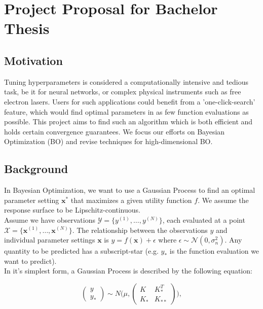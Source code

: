 \section{Project Proposal for Bachelor Thesis}
\subsection{Motivation}

Tuning hyperparameters is considered a computationally intensive and tedious task, be it for neural networks, or complex physical instruments such as free electron lasers.
Users for such applications could benefit from a 'one-click-search' feature, which would find optimal parameters in as few function evaluations as possible.
This project aims to find such an algorithm which is both efficient and holds certain convergence guarantees.
We focus our efforts on Bayesian Optimization (BO) and revise techniques for high-dimensional BO. \\

\subsection{Background}

In Bayesian Optimization, we want to use a Gaussian Process to find an optimal parameter setting $\mathbf{x^*}$ that maximizes a given utility function $f$.
We assume the response surface to be Lipschitz-continuous. \\

Assume we have observations $ \mathcal{Y} = \{ y^{(1)}, \ldots, y^{(N)} \}$, each evaluated at a point $ \mathcal{X} = \{  \mathbf{x}^{(1)}, \ldots, \mathbf{x}^{(N)} \}$.
The relationship between the observations $y$ and individual parameter settings $\mathbf{x}$ is $y = f \left( \mathbf{x} \right) + \epsilon$ where $\epsilon \sim  \mathcal{N} \left( 0, \sigma^2_n \right)$. Any quantity to be predicted has a subscript-star (e.g. $y_*$ is the function evaluation we want to predict).\\

In it's simplest form, a Gaussian Process is described by the following equation:

\begin{equation}
\begin{pmatrix} y \\
y_* \end{pmatrix} \sim N\Biggl(\mu,\begin{pmatrix} K & K^T_*\\
 K_* & K_{**} \end{pmatrix}\Biggr),
\end{equation}

